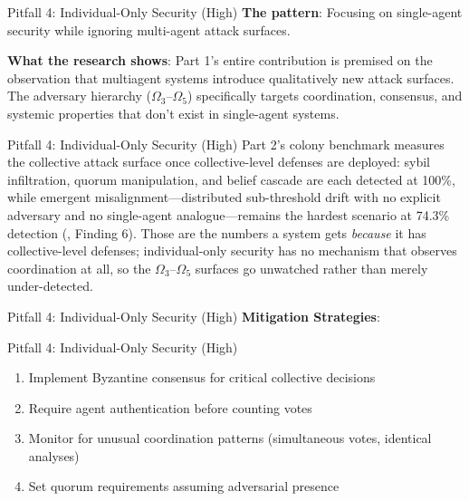 \documentclass[
  ignorenonframetext,
]{beamer}
\providecommand{\tightlist}{%
  \setlength{\itemsep}{0pt}\setlength{\parskip}{0pt}}
\providecommand{\cref}[1]{\texttt{\detokenize{#1}}}
\begin{document}
\begin{frame}[allowframebreaks]{Pitfall 4: Individual-Only Security
(High)}
\protect{}\label{pitfall-4-individual-only-security-high}
\textbf{The pattern}: Focusing on single-agent security while ignoring
multi-agent attack surfaces.

\textbf{What the research shows}: Part 1's entire contribution is
premised on the observation that multiagent systems introduce
qualitatively new attack surfaces. The adversary hierarchy
(\(\Omega_3\)--\(\Omega_5\)) specifically targets coordination,
consensus, and systemic properties that don't exist in single-agent
systems.

\end{frame}

\begin{frame}[allowframebreaks]{Pitfall 4: Individual-Only Security
(High)}
Part 2's colony benchmark measures the collective attack surface once
collective-level defenses are deployed: sybil infiltration, quorum
manipulation, and belief cascade are each detected at 100\%, while
emergent misalignment---distributed sub-threshold drift with no explicit
adversary and no single-agent analogue---remains the hardest scenario at
74.3\% detection (\cref{sec:paper2-review}, Finding 6). Those are the
numbers a system gets \emph{because} it has collective-level defenses;
individual-only security has no mechanism that observes coordination at
all, so the \(\Omega_3\)--\(\Omega_5\) surfaces go unwatched rather than
merely under-detected.

\end{frame}

\begin{frame}[allowframebreaks]{Pitfall 4: Individual-Only Security
(High)}
\textbf{Mitigation Strategies}:

\end{frame}

\begin{frame}[allowframebreaks]{Pitfall 4: Individual-Only Security
(High)}
\begin{enumerate}
\tightlist
\item
  Implement Byzantine consensus for critical collective decisions
\item
  Require agent authentication before counting votes
\item
  Monitor for unusual coordination patterns (simultaneous votes,
  identical analyses)
\item
  Set quorum requirements assuming adversarial presence
\end{enumerate}
\end{frame}
\end{document}
